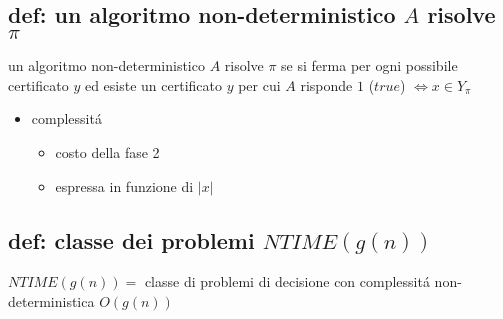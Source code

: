 
\subsection*{def: un algoritmo non-deterministico $A$ risolve $\pi$}
\begin{flushleft}
	un algoritmo non-deterministico $A$ risolve $\pi$ se si ferma per ogni possibile certificato $y$ ed esiste un certificato $y$ per cui $A$ risponde $1$ ($true$) $\iff x\in Y_{\pi}$
	\begin{itemize}
		\item complessit\'a
		\begin{itemize}
			\item costo della fase 2
			\item espressa in funzione di $|x|$
		\end{itemize}
	\end{itemize}
\end{flushleft}


\subsection*{def: classe dei problemi $NTIME(g(n))$}
\begin{flushleft}
	$NTIME(g(n))=$ classe di problemi di decisione con complessit\'a non-deterministica $O(g(n))$
\end{flushleft}


